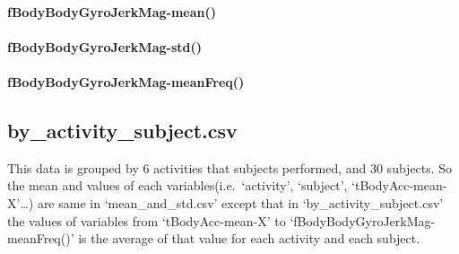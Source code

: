 \documentclass[
]{article}
\begin{document}
\hypertarget{fbodybodygyrojerkmag-mean}{%
\paragraph{fBodyBodyGyroJerkMag-mean()}\label{fbodybodygyrojerkmag-mean}}

\hypertarget{fbodybodygyrojerkmag-std}{%
\paragraph{fBodyBodyGyroJerkMag-std()}\label{fbodybodygyrojerkmag-std}}

\hypertarget{fbodybodygyrojerkmag-meanfreq}{%
\paragraph{\texorpdfstring{fBodyBodyGyroJerkMag-meanFreq()}{fBodyBodyGyroJerkMag-meanFreq()    }}\label{fbodybodygyrojerkmag-meanfreq}}

\hypertarget{by_activity_subject.csv}{%
\subsection{\texorpdfstring{by\_activity\_subject.csv}{by\_activity\_subject.csv  }}\label{by_activity_subject.csv}}

This data is grouped by 6 activities that subjects performed, and 30
subjects. So the mean and values of each variables(i.e.~`activity',
`subject', `tBodyAcc-mean-X'\ldots) are same in `mean\_and\_std.csv'
except that in `by\_activity\_subject.csv' the values of variables from
`tBodyAcc-mean-X' to `fBodyBodyGyroJerkMag-meanFreq()' is the average of
that value for each activity and each subject.
\end{document}
